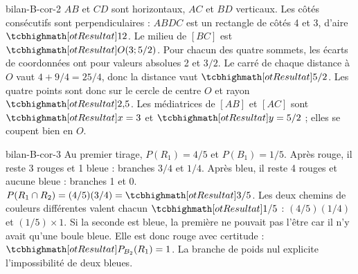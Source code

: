 \begin{blocEdition}{bilan-B-cor-2}
$AB$ et $CD$ sont horizontaux, $AC$ et $BD$ verticaux. Les côtés consécutifs sont perpendiculaires : $ABDC$ est un rectangle de côtés 4 et 3, d’aire $\res{12}$.
Le milieu de $[BC]$ est $\res{O(3;5/2)}$. Pour chacun des quatre sommets, les écarts de coordonnées ont pour valeurs absolues 2 et $3/2$. Le carré de chaque distance à $O$ vaut $4+9/4=25/4$, donc la distance vaut $\res{5/2}$.
Les quatre points sont donc sur le cercle de centre $O$ et rayon $\res{2{,}5}$. Les médiatrices de $[AB]$ et $[AC]$ sont $\res{x=3}$ et $\res{y=5/2}$ ; elles se coupent bien en $O$.
\label{fig-bilan-B-cor-2}

\end{blocEdition}
\begin{blocEdition}{bilan-B-cor-3}
Au premier tirage, $P(R_1)=4/5$ et $P(B_1)=1/5$. Après rouge, il reste 3 rouges et 1 bleue : branches $3/4$ et $1/4$. Après bleu, il reste 4 rouges et aucune bleue : branches 1 et 0.
$P(R_1\cap R_2)=(4/5)(3/4)=\res{3/5}$. Les deux chemins de couleurs différentes valent chacun $\res{1/5}$ : $(4/5)(1/4)$ et $(1/5)\times1$.
Si la seconde est bleue, la première ne pouvait pas l’être car il n’y avait qu’une boule bleue. Elle est donc rouge avec certitude : $\res{P_{B_2}(R_1)=1}$. La branche de poids nul explicite l’impossibilité de deux bleues.
\label{fig-bilan-B-cor-3}

\end{blocEdition}
